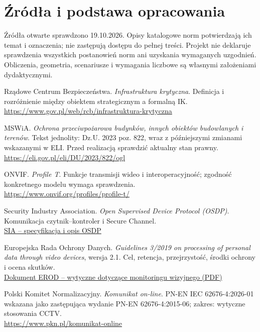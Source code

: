 \section{Źródła i podstawa opracowania}
\small
Źródła otwarte sprawdzono 19.10.2026. Opisy katalogowe norm potwierdzają ich temat i oznaczenia; nie zastępują dostępu do pełnej treści. Projekt nie deklaruje sprawdzenia wszystkich postanowień norm ani uzyskania wymaganych uzgodnień. Obliczenia, geometria, scenariusze i wymagania liczbowe są własnymi założeniami dydaktycznymi.

\begin{enumerate}[label={[\arabic*]},itemsep=8pt,leftmargin=8mm]
\item Rządowe Centrum Bezpieczeństwa. \textit{Infrastruktura krytyczna}. Definicja i rozróżnienie między obiektem strategicznym a formalną IK.\\\url{https://www.gov.pl/web/rcb/infrastruktura-krytyczna}
\item MSWiA. \textit{Ochrona przeciwpożarowa budynków, innych obiektów budowlanych i terenów}. Tekst jednolity: Dz.U. 2023 poz. 822, wraz z późniejszymi zmianami wskazanymi w ELI. Przed realizacją sprawdzić aktualny stan prawny.\\\url{https://eli.gov.pl/eli/DU/2023/822/ogl}
\item ONVIF. \textit{Profile T}. Funkcje transmisji wideo i interoperacyjność; zgodność konkretnego modelu wymaga sprawdzenia.\\\url{https://www.onvif.org/profiles/profile-t/}
\item Security Industry Association. \textit{Open Supervised Device Protocol (OSDP)}. Komunikacja czytnik--kontroler i Secure Channel.\\\href{https://www.securityindustry.org/industry-standards/open-supervised-device-protocol/}{SIA -- specyfikacja i opis OSDP}
\item Europejska Rada Ochrony Danych. \textit{Guidelines 3/2019 on processing of personal data through video devices}, wersja 2.1. Cel, retencja, przejrzystość, środki ochrony i ocena skutków.\\\href{https://www.edpb.europa.eu/sites/default/files/files/file1/edpb_guidelines_201903_video_devices_en_0.pdf}{Dokument EROD -- wytyczne dotyczące monitoringu wizyjnego (PDF)}
\item Polski Komitet Normalizacyjny. \textit{Komunikat on-line}. PN-EN IEC 62676-4:2026-01 wskazana jako zastępująca wydanie PN-EN 62676-4:2015-06; zakres: wytyczne stosowania CCTV.\\\url{https://www.pkn.pl/komunikat-online}

\end{enumerate}
